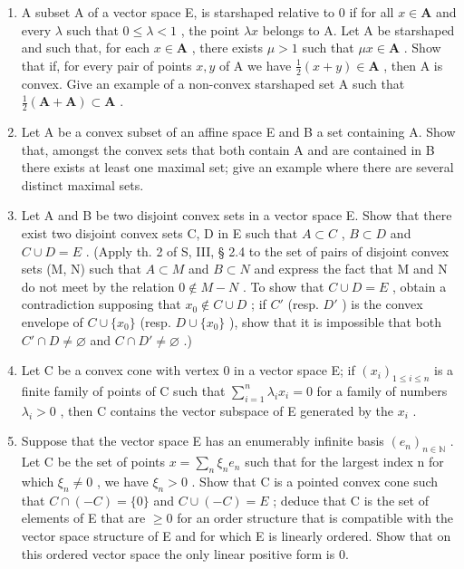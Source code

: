 \exercisegroup

\begin{enumerate}
\def\labelenumi{\arabic{enumi})}
\item
  A subset A of a vector space E, is starshaped relative to 0 if for all \(x \in \mathbf{A}\) and every \(\lambda\) such that \(0 \leqslant \lambda < 1\) , the point \(\lambda x\) belongs to A. Let A be starshaped and such that, for each \(x \in \mathbf{A}\) , there exists \(\mu > 1\) such that \(\mu x \in \mathbf{A}\) . Show that if, for every pair of points \(x, y\) of A we have \(\frac{1}{2}(x + y) \in \mathbf{A}\) , then A is convex. Give an example of a non-convex starshaped set A such that \(\frac{1}{2}(\mathbf{A} + \mathbf{A}) \subset \mathbf{A}\) .
\item
  Let A be a convex subset of an affine space E and B a set containing A. Show that, amongst the convex sets that both contain A and are contained in B there exists at least one maximal set; give an example where there are several distinct maximal sets.
\item
  Let A and B be two disjoint convex sets in a vector space E. Show that there exist two disjoint convex sets C, D in E such that \(A \subset C\) , \(B \subset D\) and \(C \cup D = E\) . (Apply th. 2 of S, III, § 2.4 to the set of pairs of disjoint convex sets (M, N) such that \(A \subset M\) and \(B \subset N\) and express the fact that M and N do not meet by the relation \(0 \notin M - N\) . To show that \(C \cup D = E\) , obtain a contradiction supposing that \(x_{0} \notin C \cup D\) ; if \(C'\) (resp. \(D'\) ) is the convex envelope of \(C \cup \{x_{0}\}\) (resp. \(D \cup \{x_{0}\}\) ), show that it is impossible that both \(C' \cap D \neq \varnothing\) and \(C \cap D' \neq \varnothing\) .)
\item
  Let C be a convex cone with vertex 0 in a vector space E; if \((x_{i})_{1\leqslant i\leqslant n}\) is a finite family of points of C such that \(\sum_{i = 1}^{n}\lambda_{i}x_{i} = 0\) for a family of numbers \(\lambda_{i} > 0\) , then C contains the vector subspace of E generated by the \(x_{i}\) .
\item
  Suppose that the vector space E has an enumerably infinite basis \((e_{n})_{n\in\mathbb{N}}\) . Let C be the set of points \(x = \sum_{n} \xi_{n} e_{n}\) such that for the largest index n for which \(\xi_{n} \neq 0\) , we have \(\xi_{n} > 0\) . Show that C is a pointed convex cone such that \(C \cap (-C) = \{0\}\) and \(C \cup (-C) = E\) ; deduce that C is the set of elements of E that are \(\geqslant 0\) for an order structure that is compatible with the vector space structure of E and for which E is linearly ordered. Show that on this ordered vector space the only linear positive form is 0.

\end{enumerate}
